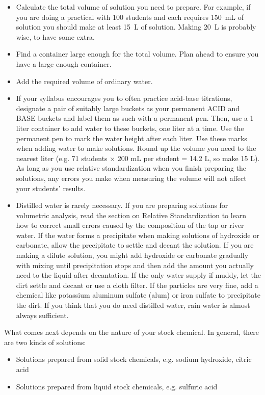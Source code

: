 \begin{itemize}

\item{Calculate the total volume of solution you need to prepare. For example, if you are doing a practical with 100 students and each requires 150~mL of solution you should make at least 15~L of solution. Making 20~L is probably wise, to have some extra.}

\item{Find a container large enough for the total volume. Plan ahead to ensure you have a large enough container.}

\item{Add the required volume of ordinary water.}

\item{If your syllabus encourages you to often practice acid-base titrations, designate a pair of suitably large buckets as your permanent ACID and BASE buckets and label them as such with a permanent pen. Then, use a 1 liter container to add water to these buckets, one liter at a time. Use the permanent pen to mark the water height after each liter. Use these marks when adding water to make solutions. Round up the volume you need to the nearest liter (e.g. 71 students $\times$ 200 mL per student = 14.2 L, so make 15 L). As long as you use relative standardization when you finish preparing the solutions, any errors you make when measuring the volume will not affect your students' results.}

\item{Distilled water is rarely necessary. If you are preparing solutions for volumetric analysis, read the section on Relative Standardization to learn how to correct small errors caused by the composition of the tap or river water. If the water forms a precipitate when making solutions of hydroxide or carbonate, allow the precipitate to settle and decant the solution. If you are making a dilute solution, you might add hydroxide or carbonate gradually with mixing until precipitation stops and then add the amount you actually need to the liquid after decantation. If the only water supply if muddy, let the dirt settle and decant or use a cloth filter. If the particles are very fine, add a chemical like potassium aluminum sulfate (alum) or iron sulfate to precipitate the dirt. If you think that you do need distilled water, rain water is almost always sufficient.}
\end{itemize}

What comes next depends on the nature of your stock chemical. In general, there are two kinds of solutions:
\begin{itemize}
\item{Solutions prepared from solid stock chemicals, e.g. sodium hydroxide, citric acid}
\item{Solutions prepared from liquid stock chemicals, e.g. sulfuric acid}
\end{itemize}

